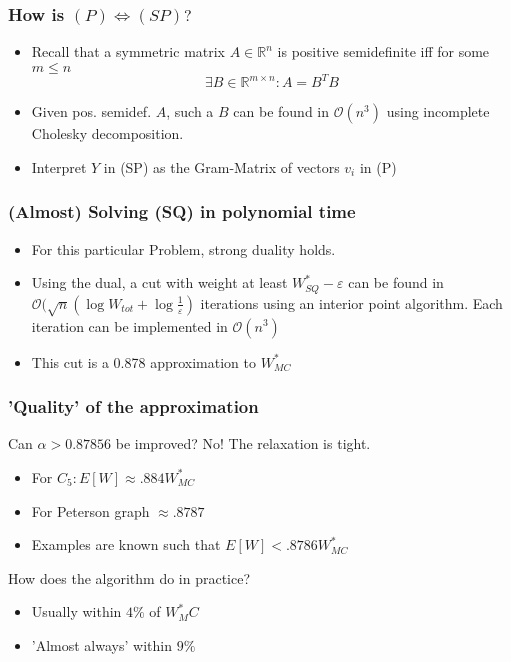 \documentclass[11pt]{beamer}
\begin{document}
	\begin{frame}\frametitle{How is $(P) \Leftrightarrow (SP)?$}
	    \begin{itemize}
	    	\item Recall that a symmetric matrix $A\in \mathbb R^n$ is positive semidefinite iff for some $m\leq n$
	    	$$\exists B\in\mathbb R^{m\times n}: A = B^TB$$
	    	\item Given pos. semidef. $A$, such a $B$ can be found in $\mathcal O(n^3)$ using incomplete Cholesky decomposition.
	    	\item Interpret $Y$ in (SP) as the Gram-Matrix of vectors $v_i$ in (P)
	    \end{itemize}
	\end{frame}

	\begin{frame}\frametitle{(Almost) Solving (SQ) in polynomial time}
		\begin{block}{}
		\begin{itemize}
			\item For this particular Problem, strong duality holds.
			\item Using the dual, a cut with weight at least $W^*_{SQ}-\varepsilon$ can be found in $\mathcal O(\sqrt{n}(\log W_{tot}+\log\frac{1}{\varepsilon})$ iterations using an interior point algorithm. Each iteration can be implemented in $\mathcal O(n^3)$
			\item This cut is a 0.878 approximation to $W_{MC}^*$
		\end{itemize}
		\end{block}
	\end{frame}

	\begin{frame}\frametitle{'Quality' of the approximation}
		\begin{block}{Can $\alpha>0.87856$ be improved?}
			No! The relaxation is tight.
			\begin{itemize}
				\item For $C_5: E[W] \approx .884 W^*_{MC}$ 
				\item For Peterson graph $\approx .8787$
				\item Examples are known such that $E[W] < .8786 W^*_{MC}$
			\end{itemize}
		\end{block}
		\begin{block}{How does the algorithm do in practice?}
			\begin{itemize}
				\item Usually within $4\%$ of $W^*_MC$
				\item 'Almost always' within $9\%$
			\end{itemize}
		\end{block}
	
	\end{frame}
\end{document}
